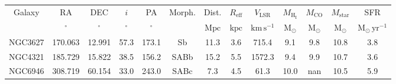 \begin{table}
\begin{tabular}{ccccccccccccc}
Galaxy & RA & DEC & $i$ & PA & Morph. & Dist. & $R_\mathrm{eff}$ & $V_\mathrm{LSR}$ & $M_\mathrm{H_I}$ & $M_\mathrm{CO}$ & $M_\mathrm{star}$ & SFR \\
 & $\mathrm{{}^{\circ}}$ & $\mathrm{{}^{\circ}}$ & $\mathrm{{}^{\circ}}$ & $\mathrm{{}^{\circ}}$ &  & $\mathrm{Mpc}$ & $\mathrm{kpc}$ & $\mathrm{km\,s^{-1}}$ & $\mathrm{M_{\odot}}$ & $\mathrm{M_{\odot}}$ & $\mathrm{M_{\odot}}$ & $\mathrm{M_{\odot}\,yr^{-1}}$ \\
NGC3627 & 170.063 & 12.991 & 57.3 & 173.1 & Sb & 11.3 & 3.6 & 715.4 & 9.1 & 9.8 & 10.8 & 3.8 \\
NGC4321 & 185.729 & 15.822 & 38.5 & 156.2 & SABb & 15.2 & 5.5 & 1572.3 & 9.4 & 9.9 & 10.7 & 3.6 \\
NGC6946 & 308.719 & 60.154 & 33.0 & 243.0 & SABc & 7.3 & 4.5 & 61.3 & 10.0 & nan & 10.5 & 5.9 \\
\end{tabular}
\end{table}
